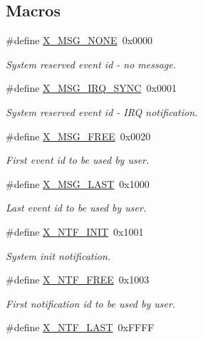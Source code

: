 \subsection*{Macros}
\begin{DoxyCompactItemize}
\item 
\#define \hyperlink{a00036_a4431051080c1f46fda1a2ce7d4931aa8}{X\+\_\+\+M\+S\+G\+\_\+\+N\+O\+N\+E}~0x0000
\begin{DoxyCompactList}\small\item\em System reserved event id -\/ no message. \end{DoxyCompactList}\item 
\#define \hyperlink{a00036_a104f1137aafb33160da80932fe63c40d}{X\+\_\+\+M\+S\+G\+\_\+\+I\+R\+Q\+\_\+\+S\+Y\+N\+C}~0x0001
\begin{DoxyCompactList}\small\item\em System reserved event id -\/ I\+R\+Q notification. \end{DoxyCompactList}\item 
\#define \hyperlink{a00036_a082eb6e82ded25b00f04da4f611c961e}{X\+\_\+\+M\+S\+G\+\_\+\+F\+R\+E\+E}~0x0020
\begin{DoxyCompactList}\small\item\em First event id to be used by user. \end{DoxyCompactList}\item 
\#define \hyperlink{a00036_afc95a839de2731289483d04a6cdaac1f}{X\+\_\+\+M\+S\+G\+\_\+\+L\+A\+S\+T}~0x1000
\begin{DoxyCompactList}\small\item\em Last event id to be used by user. \end{DoxyCompactList}\item 
\#define \hyperlink{a00036_a620b808f2d7b8d2a03c4d026a4c5423c}{X\+\_\+\+N\+T\+F\+\_\+\+I\+N\+I\+T}~0x1001
\begin{DoxyCompactList}\small\item\em System init notification. \end{DoxyCompactList}\item 
\#define \hyperlink{a00036_ab2eeea4643823a0c7c7731ddb83e3edc}{X\+\_\+\+N\+T\+F\+\_\+\+F\+R\+E\+E}~0x1003
\begin{DoxyCompactList}\small\item\em First notification id to be used by user. \end{DoxyCompactList}\item 
\#define \hyperlink{a00036_a63072b0b734748ae21fd9e7435467683}{X\+\_\+\+N\+T\+F\+\_\+\+L\+A\+S\+T}~0x\+F\+F\+F\+F

\end{DoxyCompactItemize}
